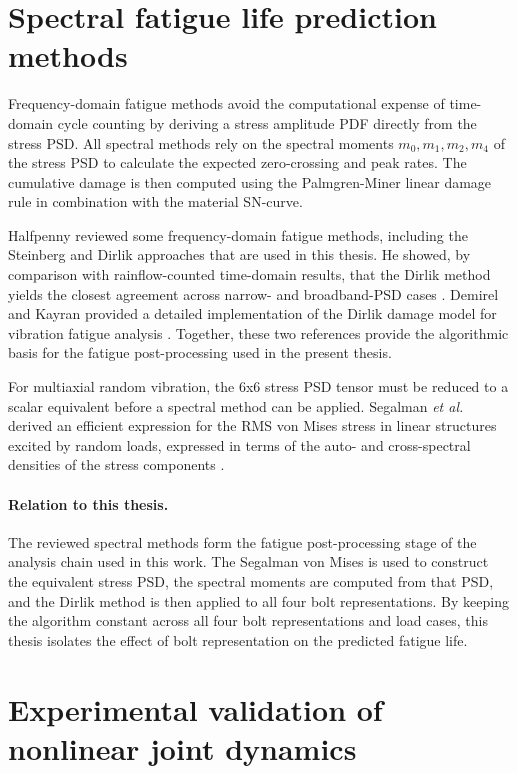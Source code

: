 \documentclass[a4paper,twoside]{bth}
\begin{document}
\section{Spectral fatigue life prediction methods}
\label{sec:spectral-fatigue}

Frequency-domain fatigue methods avoid the computational expense of time-domain cycle counting by deriving a stress amplitude \ac{PDF} directly from the stress \ac{PSD}. All spectral methods rely on the spectral moments $m_0, m_1, m_2, m_4$ of the stress \ac{PSD} to calculate the expected zero-crossing and peak rates. The cumulative damage is then computed using the Palmgren-Miner linear damage rule in combination with the material SN-curve.

Halfpenny reviewed some frequency-domain fatigue methods, including the Steinberg and Dirlik approaches that are used in this thesis. He showed, by comparison with rainflow-counted time-domain results, that the Dirlik method yields the closest agreement across narrow- and broadband-\ac{PSD} cases \cite{halfpenny_frequency_1999}. Demirel and Kayran provided a detailed implementation of the Dirlik damage model for vibration fatigue analysis \cite{72}. Together, these two references provide the algorithmic basis for the fatigue post-processing used in the present thesis.

For multiaxial random vibration, the 6x6 stress \ac{PSD} tensor must be reduced to a scalar equivalent before a spectral method can be applied. Segalman \textit{et al.} derived an efficient expression for the \ac{RMS} von Mises stress in linear structures excited by random loads, expressed in terms of the auto- and cross-spectral densities of the stress components \cite{segalman_efficient_2000}. 

\paragraph{Relation to this thesis.}
The reviewed spectral methods form the fatigue post-processing stage of the analysis chain used in this work. The Segalman von Mises is used to construct the equivalent stress \ac{PSD}, the spectral moments are computed from that \ac{PSD}, and the Dirlik method is then applied to all four bolt representations. By keeping the algorithm constant across all four bolt representations and load cases, this thesis isolates the effect of bolt representation on the predicted fatigue life.

\section{Experimental validation of nonlinear joint dynamics}
\label{sec:experimental}
\end{document}
